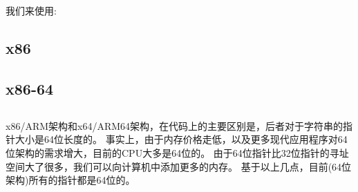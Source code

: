 \section{\HelloWorldSectionName}
\label{sec:helloworld}

我们来使用:



\subsection{x86}




\subsection{x86-64}







\subsection{\Conclusion{}}

x86/ARM架构和x64/ARM64架构，在代码上的主要区别是，后者对于字符串的指针大小是64位长度的。
事实上，由于内存价格走低，以及更多现代应用程序对64位架构的需求增大，目前的\ac{CPU}大多是64位的。
由于64位指针比32位指针的寻址空间大了很多，我们可以向计算机中添加更多的内存。
基于以上几点，目前(64位架构)所有的指针都是64位的。



